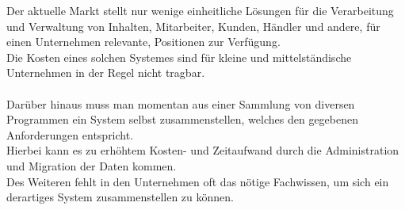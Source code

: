 Der aktuelle Markt stellt nur wenige einheitliche Lösungen für die Verarbeitung und Verwaltung von Inhalten, Mitarbeiter, Kunden, Händler und andere, für einen Unternehmen relevante, Positionen zur Verfügung.\\
Die Kosten eines solchen Systemes sind für kleine und mittelständische Unternehmen in der Regel nicht tragbar.\\
\\
Darüber hinaus muss man momentan aus einer Sammlung von diversen Programmen ein System selbst zusammenstellen, welches den gegebenen Anforderungen entspricht.\\
Hierbei kann es zu erhöhtem Kosten- und Zeitaufwand durch die Administration und Migration der Daten kommen.\\
Des Weiteren fehlt in den Unternehmen oft das nötige Fachwissen, um sich ein derartiges System zusammenstellen zu können.
